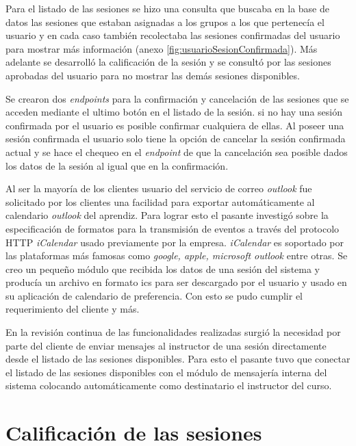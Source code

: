 	Para el listado de las sesiones se hizo una consulta que buscaba en la base de datos las sesiones que estaban asignadas a los grupos a los que pertenecía el usuario y en cada caso también recolectaba las sesiones confirmadas del usuario para mostrar más información (anexo \ref{fig:usuarioSesionConfirmada}). Más adelante se desarrolló la calificación de la sesión y se consultó por las sesiones aprobadas del usuario para no mostrar las demás sesiones disponibles.

	Se crearon dos \emph{endpoints} para la confirmación y cancelación de las sesiones que se acceden mediante el ultimo botón en el listado de la sesión. si no hay una sesión confirmada por el usuario es posible confirmar cualquiera de ellas. Al poseer una sesión confirmada el usuario solo tiene la opción de cancelar la sesión confirmada actual y se hace el chequeo en el \emph{endpoint} de que la cancelación sea posible dados los datos de la sesión al igual que en la confirmación.

	Al ser la mayoría de los clientes usuario del servicio de correo \emph{outlook} fue solicitado por los clientes una facilidad para exportar automáticamente al calendario \emph{outlook} del aprendiz. Para lograr esto el pasante investigó sobre la especificación de formatos para la transmisión de eventos a través del protocolo \gls{HTTP} \emph{iCalendar} usado previamente por la empresa. \emph{iCalendar} es soportado por las plataformas más famosas como \emph{google, apple, microsoft outlook} entre otras. Se creo un pequeño módulo que recibida los datos de una sesión del sistema y producía un archivo en formato ics para ser descargado por el usuario y usado en su aplicación de calendario de preferencia. Con esto se pudo cumplir el requerimiento del cliente y más.

	En la revisión continua de las funcionalidades realizadas surgió la necesidad por parte del cliente de enviar mensajes al instructor de una sesión directamente desde el listado de las sesiones disponibles. Para esto el pasante tuvo que conectar el listado de las sesiones disponibles con el módulo de mensajería interna del sistema colocando automáticamente como destinatario el instructor del curso.

	\section{Calificación de las sesiones} %
	\label{sec:calificacion_de_las_sesiones}
	
